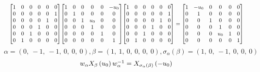 \documentclass[11pt]{article}
\theoremstyle{definition}
\begin{document}
\[
\scaletoalign{\textwidth}{{\left[\begin{matrix}1 & 0 & 0 & 0 & 0 & 0\\0 & 0 & 0 & 0 & 0 & 1\\0 & 0 & 0 & 0 & 1 & 0\\0 & 0 & 0 & 1 & 0 & 0\\0 & 0 & 1 & 0 & 0 & 0\\0 & 1 & 0 & 0 & 0 & 0\end{matrix}\right]} {\left[\begin{matrix}1 & 0 & 0 & 0 & 0 & - u_{0}\\0 & 1 & 0 & 0 & 0 & 0\\0 & 0 & 1 & u_{0} & 0 & 0\\0 & 0 & 0 & 1 & 0 & 0\\0 & 0 & 0 & 0 & 1 & 0\\0 & 0 & 0 & 0 & 0 & 1\end{matrix}\right]} {\left[\begin{matrix}1 & 0 & 0 & 0 & 0 & 0\\0 & 0 & 0 & 0 & 0 & 1\\0 & 0 & 0 & 0 & 1 & 0\\0 & 0 & 0 & 1 & 0 & 0\\0 & 0 & 1 & 0 & 0 & 0\\0 & 1 & 0 & 0 & 0 & 0\end{matrix}\right]} = {\left[\begin{matrix}1 & - u_{0} & 0 & 0 & 0 & 0\\0 & 1 & 0 & 0 & 0 & 0\\0 & 0 & 1 & 0 & 0 & 0\\0 & 0 & 0 & 1 & 0 & 0\\0 & 0 & 0 & u_{0} & 1 & 0\\0 & 0 & 0 & 0 & 0 & 1\end{matrix}\right]}}
\]
\[
\alpha = \left( 0, \  -1, \  -1, \  0, \  0, \  0\right), \beta = \left( 1, \  1, \  0, \  0, \  0, \  0\right), \sigma_{\alpha}(\beta) = \left( 1, \  0, \  -1, \  0, \  0, \  0\right)
\]
\[
\scaletoalign{\textwidth}{w_{\alpha} X_{\beta}\left(u_{0}\right) w_{\alpha}^{-1} = X_{\sigma_{\alpha}\left(\beta\right)}\left(- u_{0}\right)}
\]
\end{document}
